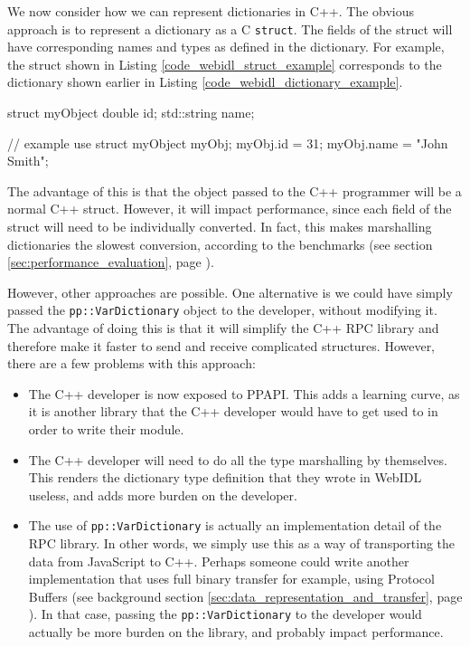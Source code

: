 We now consider how we can represent dictionaries in C++. The obvious approach is to represent a dictionary as a C \lstinline{struct}. The fields of the struct will have corresponding names and types as defined in the dictionary. For example, the struct shown in Listing \ref{code_webidl_struct_example} corresponds to the dictionary shown earlier in Listing \ref{code_webidl_dictionary_example}.


\begin{code}
struct myObject {
  double id;
  std::string name;
}

// example use
struct myObject myObj;
myObj.id = 31;
myObj.name = "John Smith";
\end{code}


The advantage of this is that the object passed to the C++ programmer will be a normal C++ struct. However, it will impact performance, since each field of the struct will need to be individually converted. In fact, this makes marshalling dictionaries the slowest conversion, according to the benchmarks (see section \ref{sec:performance_evaluation}, page \pageref{sec:performance_evaluation}).

However, other approaches are possible. One alternative is we could have simply passed the \lstinline{pp::VarDictionary} object to the developer, without modifying it. The advantage of doing this is that it will simplify the C++ RPC library and therefore make it faster to send and receive complicated structures. However, there are a few problems with this approach:

\begin{itemize}
	\item The C++ developer is now exposed to PPAPI. This adds a learning curve, as it is another library that the C++ developer would have to get used to in order to write their module.
	\item The C++ developer will need to do all the type marshalling by themselves. This renders the dictionary type definition that they wrote in WebIDL useless, and adds more burden on the developer.
	\item The use of \lstinline{pp::VarDictionary} is actually an implementation detail of the RPC library. In other words, we simply use this as a way of transporting the data from JavaScript to C++. Perhaps someone could write another implementation that uses full binary transfer for example, using Protocol Buffers (see background section \ref{sec:data_representation_and_transfer}, page \pageref{sec:data_representation_and_transfer}). In that case, passing the \lstinline{pp::VarDictionary} to the developer would actually be more burden on the library, and probably impact performance.
\end{itemize}

